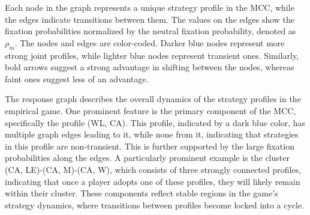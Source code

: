         \noindent
        Each node in the graph represents a unique strategy profile in the MCC, while the edges indicate transitions between them. The values on the edges show the fixation probabilities normalized by the neutral fixation probability, denoted as $\rho_m$. The nodes and edges are color-coded. Darker blue nodes represent more strong joint profiles, while lighter blue nodes represent transient ones. Similarly, bold arrows suggest a strong advantage in shifting between the nodes, whereas faint ones suggest less of an advantage.\tinydouble

        \noindent
        The response graph describes the overall dynamics of the strategy profiles in the empirical game. One prominent feature is the primary component of the MCC, specifically the profile (WL, CA). This profile, indicated by a dark blue color, has multiple graph edges leading to it, while none from it, indicating that strategies in this profile are non-transient. This is further supported by the large fixation probabilities along the edges. A particularly prominent example is the cluster (CA, LE)-(CA, M)-(CA, W), which consists of three strongly connected profiles, indicating that once a player adopts one of these profiles, they will likely remain within their cluster. These components reflect stable regions in the game’s strategy dynamics, where transitions between profiles become locked into a cycle.\tinydouble

